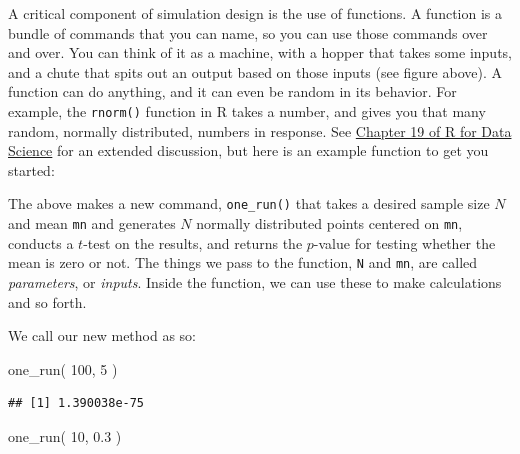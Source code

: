 \documentclass[
]{book}
\newenvironment{Shaded}{\begin{snugshade}}{\end{snugshade}}
\newcommand{\AttributeTok}[1]{\textcolor[rgb]{0.77,0.63,0.00}{#1}}
\newcommand{\ControlFlowTok}[1]{\textcolor[rgb]{0.13,0.29,0.53}{\textbf{#1}}}
\newcommand{\DecValTok}[1]{\textcolor[rgb]{0.00,0.00,0.81}{#1}}
\newcommand{\FloatTok}[1]{\textcolor[rgb]{0.00,0.00,0.81}{#1}}
\newcommand{\FunctionTok}[1]{\textcolor[rgb]{0.00,0.00,0.00}{#1}}
\newcommand{\NormalTok}[1]{#1}
\newcommand{\OtherTok}[1]{\textcolor[rgb]{0.56,0.35,0.01}{#1}}
\newcommand{\SpecialCharTok}[1]{\textcolor[rgb]{0.00,0.00,0.00}{#1}}
\begin{document}
A critical component of simulation design is the use of functions.
A function is a bundle of commands that you can name, so you can use those commands over and over.
You can think of it as a machine, with a hopper that takes some inputs, and a chute that spits out an output based on those inputs (see figure above).
A function can do anything, and it can even be random in its behavior.
For example, the \texttt{rnorm()} function in R takes a number, and gives you that many random, normally distributed, numbers in response.
See \href{https://r4ds.had.co.nz/functions.html}{Chapter 19 of R for Data Science} for an extended discussion, but here is an example function to get you started:

\begin{Shaded}
\end{Shaded}

The above makes a new command, \texttt{one\_run()} that takes a desired sample size \(N\) and mean \texttt{mn} and generates \(N\) normally distributed points centered on \texttt{mn}, conducts a \(t\)-test on the results, and returns the \(p\)-value for testing whether the mean is zero or not.
The things we pass to the function, \texttt{N} and \texttt{mn}, are called \emph{parameters}, or \emph{inputs}.
Inside the function, we can use these to make calculations and so forth.

We call our new method as so:

\begin{Shaded}
\begin{Highlighting}[]
\FunctionTok{one\_run}\NormalTok{( }\DecValTok{100}\NormalTok{, }\DecValTok{5}\NormalTok{ )}
\end{Highlighting}
\end{Shaded}

\begin{verbatim}
## [1] 1.390038e-75
\end{verbatim}

\begin{Shaded}
\begin{Highlighting}[]
\FunctionTok{one\_run}\NormalTok{( }\DecValTok{10}\NormalTok{, }\FloatTok{0.3}\NormalTok{ )}
\end{Highlighting}
\end{Shaded}
\end{document}
